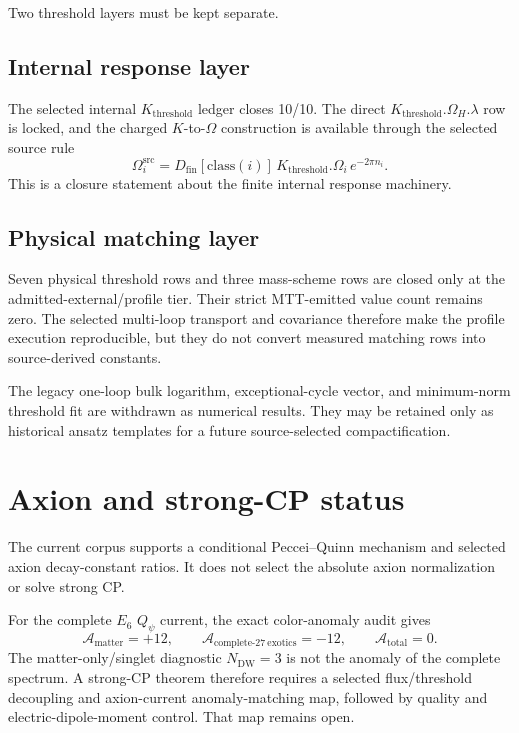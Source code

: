 \documentclass[11pt]{article}
\begin{document}
Two threshold layers must be kept separate.

\subsection{Internal response layer}

The selected internal $K_{\mathrm{threshold}}$ ledger closes 10/10. The direct
$K_{\mathrm{threshold}}.\Omega_H.\lambda$ row is locked, and the charged
$K$-to-$\Omega$ construction is available through the selected source rule
\[
\Omega_i^{\mathrm{src}}
=D_{\mathrm{fin}}[\mathrm{class}(i)]\,
K_{\mathrm{threshold}}.\Omega_i\,e^{-2\pi n_i}.
\]
This is a closure statement about the finite internal response machinery.

\subsection{Physical matching layer}

Seven physical threshold rows and three mass-scheme rows are closed only at the
admitted-external/profile tier. Their strict MTT-emitted value count remains
zero. The selected multi-loop transport and covariance therefore make the
profile execution reproducible, but they do not convert measured matching rows
into source-derived constants.

The legacy one-loop bulk logarithm, exceptional-cycle vector, and minimum-norm
threshold fit are withdrawn as numerical results. They may be retained only as
historical ansatz templates for a future source-selected compactification.

\section{Axion and strong-CP status}

The current corpus supports a conditional Peccei--Quinn mechanism and selected
axion decay-constant ratios. It does not select the absolute axion
normalization or solve strong CP.

For the complete $E_6$ $Q_\psi$ current, the exact color-anomaly audit gives
\[
\mathcal A_{\mathrm{matter}}=+12,
\qquad
\mathcal A_{\mathrm{complete\mbox{-}27\ exotics}}=-12,
\qquad
\mathcal A_{\mathrm{total}}=0.
\]
The matter-only/singlet diagnostic $N_{\mathrm{DW}}=3$ is not the anomaly of the
complete spectrum. A strong-CP theorem therefore requires a selected
flux/threshold decoupling and axion-current anomaly-matching map, followed by
quality and electric-dipole-moment control. That map remains open.
\end{document}
